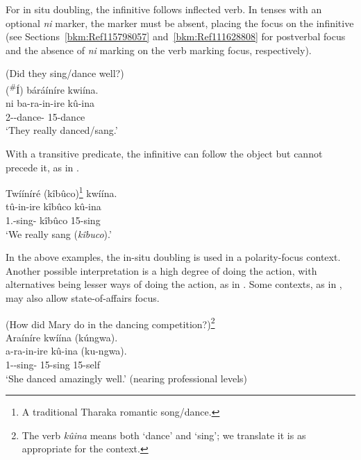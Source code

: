\documentclass[output=paper]{langscibook}
\begin{document}
For in situ doubling, the infinitive follows inflected verb. In tenses with an optional \textit{ni} marker, the marker must be absent, placing the focus on the infinitive (see Sections~\ref{bkm:Ref115798057} and~\ref{bkm:Ref111628808} for postverbal focus and the absence of \textit{ni} marking on the verb marking focus, respectively).

\ea
(Did they sing/dance well?)\\
(\textsuperscript{\#}Í) báráíníre kwiína.\\
\gll
ni  ba-ra-in-ire  kû-ina\\
\FOC{}  2\SM-\YPST{}-dance-\PFV{} 15-dance\\
\glt
‘They really danced/sang.’

\z

With a transitive predicate, the infinitive can follow the object but cannot precede it, as in .\largerpage[-1]\pagebreak

\ea
\label{bkm:Ref115797716}
Twííníré (kîbûco)\footnote{A traditional Tharaka romantic song/dance.} kwíína.\\
\gll
tû-in-ire  kîbûco  kû-ina\\
1\PL.\SM{}-sing-\PFV{} kîbûco  15-sing\\
\glt
‘We really sang (\textit{kîbuco}).’

\z

In the above examples, the in-situ doubling is used in a polarity-focus context. Another possible interpretation is a high degree of doing the action, with alternatives being lesser ways of doing the action, as in . Some contexts, as in , may also allow state-of-affairs focus.

\ea
\label{bkm:Ref118553700}
(How did Mary do in the dancing competition?)\footnote{The verb \textit{kûina} means both ‘dance’ and ‘sing’; we translate it is as appropriate for the context.}\\
Araíníre kwíína (kúngwa).\\
\gll
a-ra-in-ire  kû-ina  (ku-ngwa).\\
1\SM{}-\YPST{}-sing-\PFV{} 15-sing  {\db}15-self\\
\glt
‘She danced amazingly well.’ (nearing professional levels)
\end{document}
